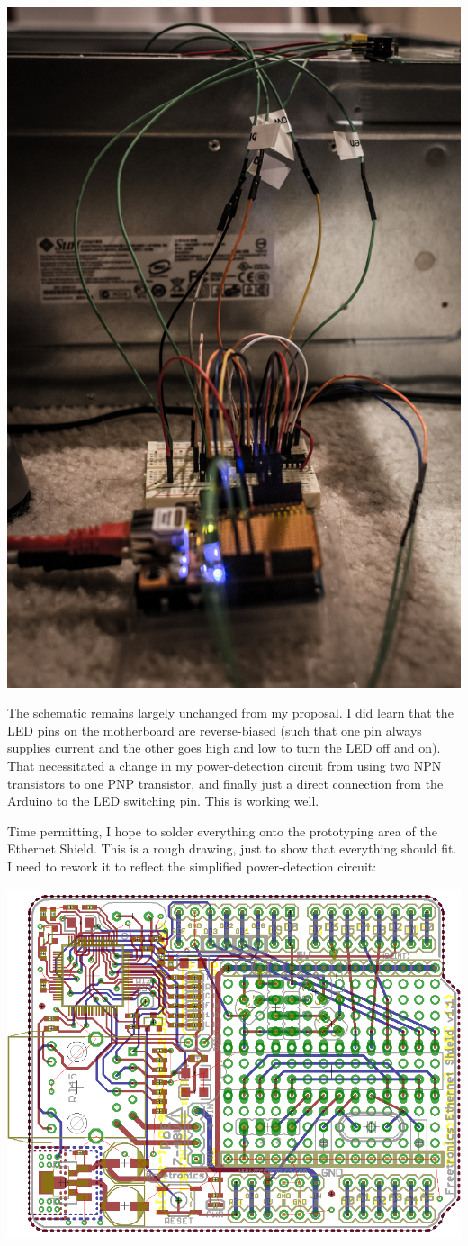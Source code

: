 \documentclass{amsart}
\begin{document}
\begin{center}
\includegraphics[width=.8\textwidth]{build.jpg}
\end{center}

The schematic remains largely unchanged from my proposal.  I did learn that the LED pins on the motherboard are reverse-biased (such that one pin always supplies current and the other goes high and low to turn the LED off and on).  That necessitated a change in my power-detection circuit from using two NPN transistors to one PNP transistor, and finally just a direct connection from the Arduino to the LED switching pin.  This is working well.

Time permitting, I hope to solder everything onto the prototyping area of the Ethernet Shield.  This is a rough drawing, just to show that everything should fit.  I need to rework it to reflect the simplified power-detection circuit:

\begin{center}
\includegraphics[width=.9\textwidth]{pcb.png}
\end{center}
\end{document}
